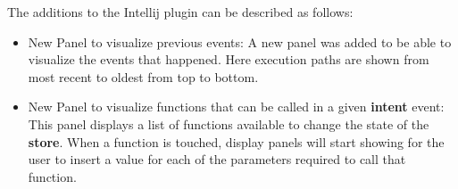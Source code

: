 The additions to the Intellij plugin can be described as follows:

\begin{itemize}
	\item New Panel to visualize previous events: A new panel was added to be able to visualize the events that happened. Here execution paths are shown from most recent to oldest from top to bottom. 
	\item New Panel to visualize functions that can be called in a given \textbf{intent} event: This panel displays a list of functions available to change the state of the \textbf{store}. When a function is touched, display panels will start showing for the user to insert a value for each of the parameters required to call that function.
\end{itemize}


\endinput

